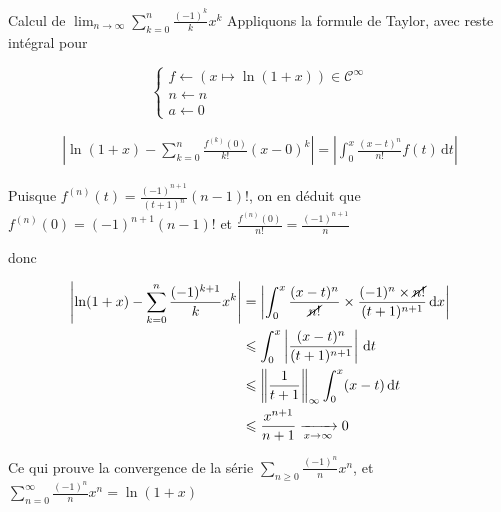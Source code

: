 \documentclass{article}
\begin{document}
\begin{question_kholle}{Calcul de $\lim_{ n \to \infty } \sum_{k=0}^{n} \frac{(-1)^{k}}{k}x^{k}$}
	Appliquons la formule de Taylor, avec reste intégral pour
	
$$
	\left\{ \begin{array}{ll}
		f \leftarrow (x \mapsto \ln(1+x)) \in \mathcal{C^{\infty}} \\
		n \leftarrow n \\
		a\leftarrow 0 
	\end{array}\right.
$$
	
	
	\begin{align*}
		\left\lvert  \ln(1+x) - \sum_{k=0}^{n} \frac{f^{(k)}(0)}{k!}(x-0)^{k}   \right\rvert = \left\lvert  \int_{0}^{x} \frac{(x-t)^{n}}{n!}f(t) \, \mathrm dt   \right\rvert 
	\end{align*}
	
	
	Puisque $f^{(n)}(t) = \frac{(-1)^{n+1}}{(t+1)^{n}}(n-1)!$, on en déduit que $f^{(n)}(0) = (-1)^{n+1}(n-1)!$ et $\frac{f^{(n)}(0)}{n!}= \frac{(-1)^{n+1}}{n}$
	
	donc
	
	\begin{align*}
		\left\lvert  \ln(1+x) - \sum_{k=0}^{n} \frac{(-1)^{k+1}}{k}x^{k}  \right\rvert  &= \left\lvert  \int_{0}^{x} \frac{(x-t)^{n}}{\cancel{ n! }}\times \frac{(-1)^{n} \times \cancel{ n! }}{(t+1)^{n+1}} \, \mathrm dx   \right\rvert \\
		&\leqslant \int_{0}^{x} \left\lvert  \frac{(x-t)^{n}}{(t+1)^{n+1}}  \right\rvert  \, \mathrm dt \\
		&\leqslant \left\| \frac{1}{t+1} \right\|_{\infty} \int_{0}^{x} (x-t) \, \mathrm dt \\
		&\leqslant \frac{x^{n+1}}{n+1} \xrightarrow[x \to \infty]{}0
	\end{align*}
	
	Ce qui prouve la convergence de la série $\sum_{n\geqslant 0} \frac{(-1)^{n}}{n}x^{n}$, et $\sum_{n=0}^{\infty} \frac{(-1)^{n}}{n}x^{n} = \ln(1+x)$
	
\end{question_kholle}
\end{document}
